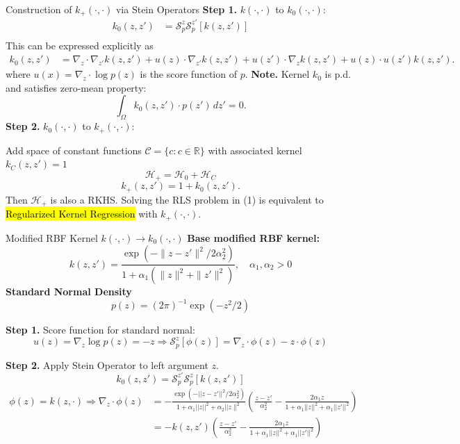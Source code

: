 \documentclass[9pt]{beamer}
\begin{document}
\begin{frame}[fragile]{Construction of $k_+(\cdot, \cdot)$ via Stein Operators}
\small
\textbf{Step 1.} $k(\cdot, \cdot)$ to $k_0(\cdot, \cdot)$:
\begin{align*}
    k_0(z, z') &= \mathcal{S}_p^z \mathcal{S}_p^{z'}[k(z, z')] \\
\end{align*}
This can be expressed explicitly as
\begin{align*}
    k_0(z, z') &= \nabla_z \cdot \nabla_{z'} k(z, z')
    + u(z) \cdot \nabla_{z'} k(z, z') 
    + u(z') \cdot \nabla_z k(z, z') 
    + u(z) \cdot u(z') k(z, z').
\end{align*}
where $u(x) = \nabla_z \cdot \log p(z)$ is the score function of $p$.
\textbf{Note.} Kernel $k_0$ is p.d. \cite{cf} and satisfies zero-mean property:
\[
\int_\Omega k_0(z, z') \cdot p(z')\, dz' = 0.
\]
\textbf{Step 2.} $k_0(\cdot, \cdot)$ to $k_+(\cdot, \cdot)$:

Add space of constant functions $\mathcal{C} = \{c : c \in \mathbb{R}\}$ with associated kernel $k_C(z,z') = 1$
\[\mathcal{H}_+ = \mathcal{H}_0 + \mathcal{H}_C\]
\[
 k_+(z,z') = 1 + k_0(z,z').
\]
Then $\mathcal{H}_+$ is also a RKHS. Solving the RLS problem in (1) is equivalent to \hl{Regularized Kernel Regression} with $k_+(\cdot, \cdot)$.
\end{frame}

\begin{frame}[fragile]{Modified RBF Kernel $k(\cdot, \cdot) \rightarrow k_0(\cdot, \cdot)$}
\small
\textbf{Base modified RBF kernel:} 
\[
k(z, z') = \frac{\exp(-\|z - z'\|^2 / 2 \alpha_2^2)}{1 + \alpha_1 (\|z\|^2 + \|z'\|^2)}, 
\quad \alpha_1, \alpha_2 > 0
\]
\textbf{Standard Normal Density}
$$p(z) = (2\pi)^{-1} \exp(-z^2/2)$$

\vspace{0.5cm}
\textbf{Step 1.} Score function for standard normal: 
\[
u(z) = \nabla_z \log p(z) = -z \Rightarrow \mathcal{S}_p^z[\phi(z)] = \nabla_z \cdot \phi(z) - z \cdot \phi(z)
\]
    
\textbf{Step 2.} Apply Stein Operator to left argument $z$.
\[k_0(z, z') = \mathcal{S}_p^{z'} \mathcal{S}_p^{z} [k(z, z')]\]
\begin{align*}
\phi(z) = k(z, \cdot) \Rightarrow \nabla_z \cdot \phi(z) &= -\frac{\exp(-||z - z'||^2 / 2 \alpha_2^2)}{1 + \alpha_1 ||z ||^2 + \alpha_2 ||z\|^2}\left(\frac{z - z'}{\alpha_2^2} - \frac{2\alpha_1 z}{1 + \alpha_1 ||z||^2 + \alpha_1 ||z'||^2} \right) \\
&= -k(z, z') \left(\frac{z - z'}{\alpha_2^2} - \frac{2\alpha_1 z}{1 + \alpha_1 ||z||^2 + \alpha_1 ||z'||^2} \right)
\end{align*}
\end{frame}
\end{document}
